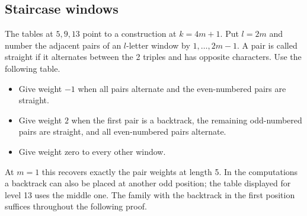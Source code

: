 \documentclass[11pt,a4paper]{amsart}
\begin{document}
\subsection{Staircase windows}
The tables at $5,9,13$ point to a construction at $k=4m+1$. Put $l=2m$ and number the adjacent pairs of an $l$-letter window by $1,\ldots,2m-1$. A pair is called straight if it alternates between the 2 triples and has opposite characters. Use the following table.
\begin{itemize}
\item Give weight $-1$ when all pairs alternate and the even-numbered pairs are straight.
\item Give weight $2$ when the first pair is a backtrack, the remaining odd-numbered pairs are straight, and all even-numbered pairs alternate.
\item Give weight zero to every other window.
\end{itemize}
At $m=1$ this recovers exactly the pair weights at length 5. In the computations a backtrack can also be placed at another odd position; the table displayed for level 13 uses the middle one. The family with the backtrack in the first position suffices throughout the following proof.
\end{document}
